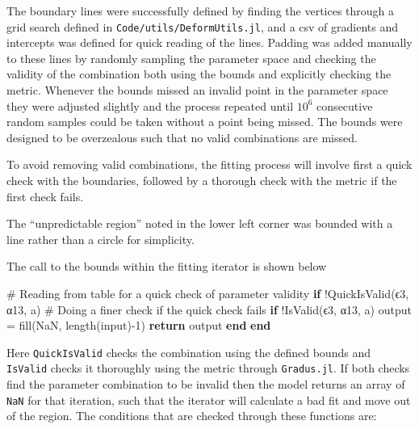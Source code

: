 \documentclass[
  letterpaper,
  DIV=11,
  numbers=noendperiod]{scrreprt}
\newenvironment{Shaded}{\begin{snugshade}}{\end{snugshade}}
\newcommand{\CommentTok}[1]{\textcolor[rgb]{0.37,0.37,0.37}{#1}}
\newcommand{\ConstantTok}[1]{\textcolor[rgb]{0.56,0.35,0.01}{#1}}
\newcommand{\ControlFlowTok}[1]{\textcolor[rgb]{0.00,0.23,0.31}{\textbf{#1}}}
\newcommand{\FloatTok}[1]{\textcolor[rgb]{0.68,0.00,0.00}{#1}}
\newcommand{\FunctionTok}[1]{\textcolor[rgb]{0.28,0.35,0.67}{#1}}
\newcommand{\NormalTok}[1]{\textcolor[rgb]{0.00,0.23,0.31}{#1}}
\newcommand{\OperatorTok}[1]{\textcolor[rgb]{0.37,0.37,0.37}{#1}}
\begin{document}
The boundary lines were successfully defined by finding the vertices
through a grid search defined in \texttt{Code/utils/DeformUtils.jl}, and
a csv of gradients and intercepts was defined for quick reading of the
lines. Padding was added manually to these lines by randomly sampling
the parameter space and checking the validity of the combination both
using the bounds and explicitly checking the metric. Whenever the bounds
missed an invalid point in the parameter space they were adjusted
slightly and the process repeated until \(10^6\) consecutive random
samples could be taken without a point being missed. The bounds were
designed to be overzealous such that no valid combinations are missed.

To avoid removing valid combinations, the fitting process will involve
first a quick check with the boundaries, followed by a thorough check
with the metric if the first check fails.

The ``unpredictable region'' noted in the lower left corner was bounded
with a line rather than a circle for simplicity.

The call to the bounds within the fitting iterator is shown below

\begin{Shaded}
\begin{Highlighting}[]
\CommentTok{\# Reading from table for a quick check of parameter validity}
\ControlFlowTok{if}\NormalTok{ !}\FunctionTok{QuickIsValid}\NormalTok{(ϵ}\FloatTok{3}\NormalTok{, α}\FloatTok{13}\NormalTok{, a)}
    \CommentTok{\# Doing a finer check if the quick check fails}
    \ControlFlowTok{if}\NormalTok{ !}\FunctionTok{IsValid}\NormalTok{(ϵ}\FloatTok{3}\NormalTok{, α}\FloatTok{13}\NormalTok{, a)}
\NormalTok{        output }\OperatorTok{=} \FunctionTok{fill}\NormalTok{(}\ConstantTok{NaN}\NormalTok{, }\FunctionTok{length}\NormalTok{(input)}\OperatorTok{{-}}\FloatTok{1}\NormalTok{)}
        \ControlFlowTok{return}\NormalTok{ output}
    \ControlFlowTok{end}
\ControlFlowTok{end}
\end{Highlighting}
\end{Shaded}

Here \texttt{QuickIsValid} checks the combination using the defined
bounds and \texttt{IsValid} checks it thoroughly using the metric
through \texttt{Gradus.jl}. If both checks find the parameter
combination to be invalid then the model returns an array of
\texttt{NaN} for that iteration, such that the iterator will calculate a
bad fit and move out of the region. The conditions that are checked
through these functions are:
\end{document}
